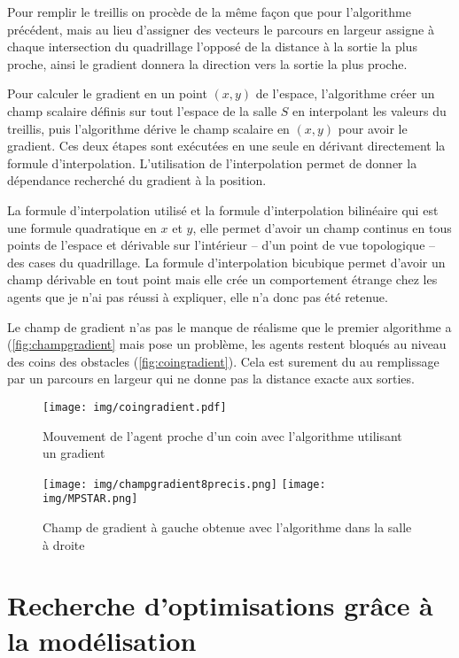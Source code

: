 \documentclass{article}
\begin{document}
Pour remplir le treillis on procède de la même façon que pour l'algorithme
précédent, mais au lieu d'assigner des vecteurs le parcours en largeur
assigne à chaque intersection du quadrillage l'opposé de la distance
à la sortie la plus proche, ainsi le gradient donnera la direction vers
la sortie la plus proche.

Pour calculer le gradient en un point $(x, y)$ de l'espace, l'algorithme
créer un champ scalaire définis sur tout l'espace de la salle $S$ en
interpolant
les valeurs du treillis, puis l'algorithme dérive le champ scalaire en
$(x, y)$ pour avoir le gradient. Ces deux étapes sont exécutées en une seule
en dérivant directement la formule d'interpolation. L'utilisation de
l'interpolation permet de donner la dépendance recherché du gradient
à la position.

La formule d'interpolation utilisé et la formule d'interpolation
bilinéaire \cite{Wikipedia1} qui est une formule quadratique
en $x$ et $y$, elle permet d'avoir un champ continus en tous points
de l'espace et dérivable sur l'intérieur -- d'un point de vue
topologique -- des cases du quadrillage. La formule d'interpolation
bicubique \cite{Wikipedia2} permet d'avoir un champ dérivable en tout
point mais elle crée un comportement étrange chez les agents que je
n'ai pas réussi à expliquer, elle n'a donc pas été retenue.

Le champ de gradient n'as pas le manque de réalisme que le premier
algorithme a (\autoref{fig:champgradient} mais pose un problème,
les agents restent bloqués
au niveau des coins des obstacles (\autoref{fig:coingradient}).
Cela est surement du au remplissage par un parcours en largeur
qui ne donne pas la distance exacte aux sorties.

\begin{figure}[h]
  \centering
  \texttt{[image: img/coingradient.pdf]}
  \caption{Mouvement de l'agent proche d'un coin avec l'algorithme utilisant
    un gradient}
  \label{fig:coingradient}
\end{figure}

\begin{figure}[h]
  \centering
  \texttt{[image: img/champgradient8precis.png]}
  \texttt{[image: img/MPSTAR.png]}
  \caption{Champ de gradient à gauche obtenue avec l'algorithme dans la
    salle à droite}
  \label{fig:champgradient}
\end{figure}

\section{Recherche d'optimisations grâce à la modélisation}
\end{document}
